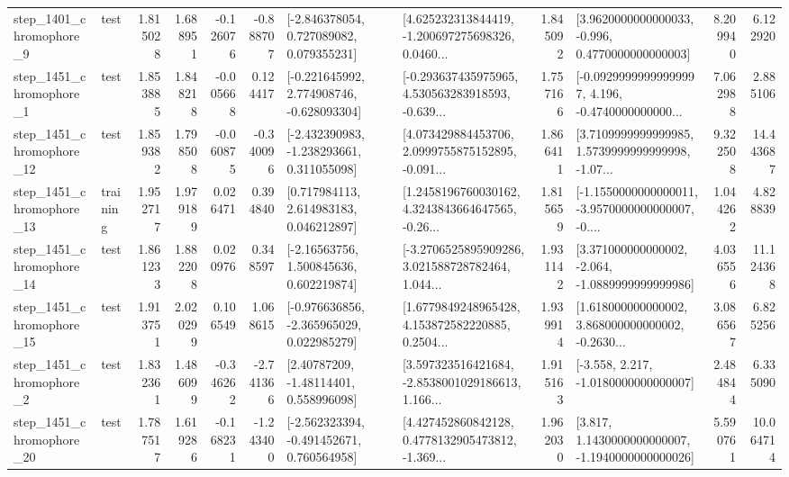 \begin{tabular}{llrrrrllrlrr}
  step\_1401\_chromophore\_9 &      test &      1.815028 &    1.688951 &     -0.126076 & -0.888707 &    [-2.846378054, 0.727089082, 0.079355231] &  [4.625232313844419, -1.200697275698326, 0.0460... &       1.845092 &   [3.9620000000000033, -0.996, 0.4770000000000003] &            8.209940 &          6.122920 \\
  step\_1451\_chromophore\_1 &      test &      1.853885 &    1.848218 &     -0.005668 &  0.124417 &   [-0.221645992, 2.774908746, -0.628093304] &  [-0.293637435975965, 4.530563283918593, -0.639... &       1.757166 &  [-0.09299999999999997, 4.196, -0.4740000000000... &            7.062988 &          2.885106 \\
 step\_1451\_chromophore\_12 &      test &      1.859382 &    1.798508 &     -0.060875 & -0.340096 &   [-2.432390983, -1.238293661, 0.311055098] &  [4.073429884453706, 2.0999755875152895, -0.091... &       1.866411 &  [3.7109999999999985, 1.5739999999999998, -1.07... &            9.322508 &         14.443687 \\
 step\_1451\_chromophore\_13 &  training &      1.952717 &    1.979189 &      0.026471 &  0.394840 &     [0.717984113, 2.614983183, 0.046212897] &  [1.2458196760030162, 4.3243843664647565, -0.26... &       1.815659 &  [-1.1550000000000011, -3.9570000000000007, -0.... &            1.044262 &          4.828839 \\
 step\_1451\_chromophore\_14 &      test &      1.861233 &    1.882208 &      0.020976 &  0.348597 &     [-2.16563756, 1.500845636, 0.602219874] &  [-3.2706525895909286, 3.021588728782464, 1.044... &       1.931142 &   [3.371000000000002, -2.064, -1.0889999999999986] &            4.036556 &         11.124368 \\
 step\_1451\_chromophore\_15 &      test &      1.913751 &    2.020299 &      0.106549 &  1.068615 &   [-0.976636856, -2.365965029, 0.022985279] &  [1.6779849248965428, 4.153872582220885, 0.2504... &       1.939914 &  [1.618000000000002, 3.868000000000002, -0.2630... &            3.086567 &          6.825256 \\
  step\_1451\_chromophore\_2 &      test &      1.832361 &    1.486099 &     -0.346262 & -2.741366 &      [2.40787209, -1.48114401, 0.558996098] &  [3.597323516421684, -2.8538001029186613, 1.166... &       1.915163 &               [-3.558, 2.217, -1.0180000000000007] &            2.484844 &          6.335090 \\
 step\_1451\_chromophore\_20 &      test &      1.787517 &    1.619286 &     -0.168231 & -1.243400 &   [-2.562323394, -0.491452671, 0.760564958] &  [4.427452860842128, 0.4778132905473812, -1.369... &       1.962030 &   [3.817, 1.1430000000000007, -1.1940000000000026] &            5.590761 &         10.064714 \\

\end{tabular}
